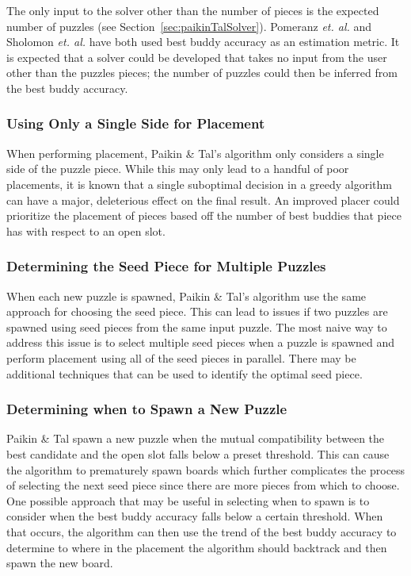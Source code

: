 \documentclass{report}
\begin{document}
The only input to the solver other than the number of pieces is the expected number of puzzles (see Section~\ref{sec:paikinTalSolver}). Pomeranz \textit{et. al.} and Sholomon \textit{et. al.} have both used best buddy accuracy as an estimation metric.  It is expected that a solver could be developed that takes no input from the user other than the puzzles pieces; the number of puzzles could then be inferred from the best buddy accuracy.


\subsubsection{Using Only a Single Side for Placement}\label{sec:limitationPlacementSingleSide}

When performing placement, Paikin \& Tal's algorithm only considers a single side of the puzzle piece.  While this may only lead to a handful of poor placements, it is known that a single suboptimal decision in a greedy algorithm can have a major, deleterious effect on the final result.  An improved placer could prioritize the placement of pieces based off the number of best buddies that piece has with respect to an open slot.

\subsubsection{Determining the Seed Piece for Multiple Puzzles}\label{sec:limitationSeedPieceMultiplePuzzles}

When each new puzzle is spawned, Paikin \& Tal's algorithm use the same approach for choosing the seed piece.  This can lead to issues if two puzzles are spawned using seed pieces from the same input puzzle.  The most naive way to address this issue is to select multiple seed pieces when a puzzle is spawned and perform placement using all of the seed pieces in parallel.  There may be additional techniques that can be used to identify the optimal seed piece.

\subsubsection{Determining when to Spawn a New Puzzle}\label{sec:limitationWhenToSpawnNewPuzzle}

Paikin \& Tal spawn a new puzzle when the mutual compatibility between the best candidate and the open slot falls below a preset threshold.  This can cause the algorithm to prematurely spawn boards which further complicates the process of selecting the next seed piece since there are more pieces from which to choose.  One possible approach that may be useful in selecting when to spawn is to consider when the best buddy accuracy falls below a certain threshold.  When that occurs, the algorithm can then use the trend of the best buddy accuracy to determine to where in the placement the algorithm should backtrack and then spawn the new board.
\end{document}
